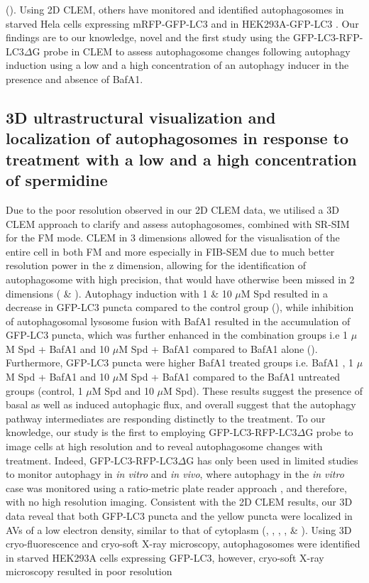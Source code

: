 (). Using 2D CLEM, others have monitored and identified autophagosomes in starved Hela cells expressing mRFP-GFP-LC3 \citep{Gudmundsson2019} and in HEK293A-GFP-LC3 \citep{Razi2009}. Our findings are to our knowledge, novel and the first study using the GFP-LC3-RFP-LC3$\Delta$G probe in CLEM to assess autophagosome changes following autophagy induction using a low and a high concentration of an autophagy inducer in the presence and absence of BafA1.

\subsection{3D ultrastructural visualization and localization of autophagosomes in response to treatment with a low and a high concentration of spermidine}
Due to the poor resolution observed in our 2D CLEM data, we utilised a 3D CLEM approach to clarify and assess autophagosomes, combined with SR-SIM for the FM mode. CLEM in 3 dimensions allowed for the visualisation of the entire cell in both FM and more especially in FIB-SEM due to much better resolution power in the z dimension, allowing for the identification of autophagosome with high precision, that would have otherwise been missed in 2 dimensions ( \& ). Autophagy induction with 1 \& 10 $\mu$M Spd resulted in a decrease in GFP-LC3 puncta compared to the control group (), while inhibition of autophagosomal lysosome fusion with BafA1 resulted in the accumulation of GFP-LC3 puncta, which was further enhanced in the combination groups i.e 1 $\mu$M Spd + BafA1 and 10 $\mu$M Spd + BafA1 compared to BafA1 alone (). Furthermore, GFP-LC3 puncta were higher BafA1 treated groups i.e. BafA1 , 1 $\mu$M Spd + BafA1 and 10 $\mu$M Spd + BafA1 compared to the BafA1 untreated groups (control, 1 $\mu$M Spd and 10 $\mu$M Spd). These results suggest the presence of basal as well as induced autophagic flux, and overall suggest that the autophagy pathway intermediates are responding distinctly to the treatment. To our knowledge, our study is the first to employing GFP-LC3-RFP-LC3$\Delta$G probe to image cells at high resolution and to reveal autophagosome changes with treatment. Indeed, GFP-LC3-RFP-LC3$\Delta$G has only been used in limited studies to monitor autophagy in \textit{in vitro} and \textit{in vivo}, where autophagy in the \textit{in vitro} case was monitored using a ratio-metric plate reader approach \citep{Kaizuka2016}, and therefore, with no high resolution imaging. Consistent with the 2D CLEM results, our 3D data reveal that both GFP-LC3 puncta and the yellow puncta were localized in AVs of a low electron density, similar to that of cytoplasm (, , , ,  \& ). Using 3D cryo-fluorescence and cryo-soft X-ray microscopy, autophagosomes were identified in starved HEK293A cells expressing GFP-LC3, however, cryo-soft X-ray microscopy resulted in poor resolution 
